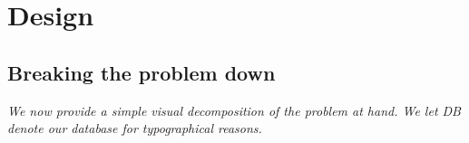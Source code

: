 \pagestyle{fancy}
\chead{\mdseries \thepage}

\usetikzlibrary{positioning}
\usetikzlibrary{calc}

\chapter{Design}

\section{Breaking the problem down}
\label{sec:breakdown}

\textit
{
We now provide a simple visual decomposition of the problem at
hand. We let DB denote our database for typographical reasons.
}

